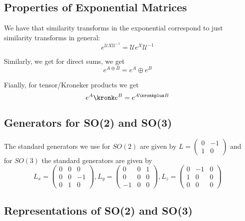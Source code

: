 \documentclass[9pt]{article}
\begin{document}
\begin{multicols}{2}
\subsection{Properties of Exponential Matrices}

We have that similarity transforms in the exponential correspond
to just similarity transforms in general:
\begin{equation}
    e^{\mathcal{U}X\mathcal{U}^{-1}} = 
    \mathcal{U}e^X\mathcal{U}^{-1}
\end{equation}

Similarly, we get for direct sums, we get 
\begin{equation}
    e^{A \oplus B} = e^{A} \oplus e^{B}
\end{equation}

Fianlly, for tensor/Kroneker products we get
\begin{equation}
    e^{A} \kronk e^{B} = e^{A \kronkplus B}
\end{equation}

\subsection{Generators for SO(2) and SO(3)}

The standard generators we use for $SO(2)$ are given by $L = \begin{pmatrix}
    0 & -1 \\
    1 & 0
\end{pmatrix}$ and for $SO(3)$ the standard generators are given by
\begin{equation*}
    L_x = \begin{pmatrix}
        0 & 0 & 0 \\
        0 & 0 & -1 \\
        0 & 1 & 0 
    \end{pmatrix},  L_y = \begin{pmatrix}
        0 & 0 & 1 \\
        0 & 0 & 0 \\
        -1 & 0 & 0 
    \end{pmatrix}, L_z = \begin{pmatrix}
        0 & -1 & 0 \\
        1 & 0 & 0 \\
        0 & 0 & 0
    \end{pmatrix}
\end{equation*}

\subsection{Representations of SO(2) and SO(3)}


\end{multicols}
\end{document}
